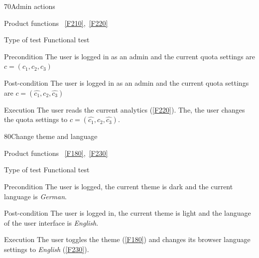 \begin{testcase}{70}{Admin actions}
  \item[Product functions]~\ref{F210},~\ref{F220}
  \item[Type of test] Functional test
  \item[Precondition] The user is logged in as an admin and the current quota settings are $c = (c_1, c_2, c_3)$
  \item[Post-condition] The user is logged in as an admin and the current quota settings are $c = (\hat{c_1}, c_2, \hat{c_3})$
  \item[Execution] The user reads the current analytics (\ref{F220}).
    The, the user changes the quota settings to $c = (\hat{c_1}, c_2, \hat{c_3})$.
\end{testcase}

\begin{testcase}{80}{Change theme and language}
  \item[Product functions]~\ref{F180},~\ref{F230}
  \item[Type of test] Functional test
  \item[Precondition] The user is logged, the current theme is dark and the current language is \textit{German}.
  \item[Post-condition] The user is logged in, the current theme is light and the language of the user interface is \textit{English}.
  \item[Execution] The user toggles the theme (\ref{F180}) and changes its browser language settings to \textit{English} (\ref{F230}).
\end{testcase}
